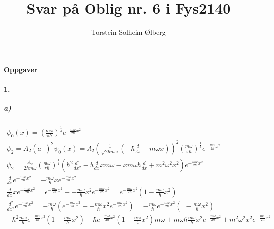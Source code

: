 \documentclass[11pt, A4paper,norsk]{article}
\author{Torstein Solheim Ølberg}
\title{Svar på Oblig nr. 6 i Fys2140}
\begin{document}
\maketitle
	\begin{center}
\Large \textbf{Oppgaver}
	\end{center}








\clearpage
		\paragraph{1.}
			\subparagraph{a)}
				\begin{gather*}
\psi_0(x) = \left( \frac{m \omega}{\pi \hbar} \right)^{\frac{1}{4}} e^{- \frac{m \omega}{2 \hbar} x^2} \\
\psi_2 = A_2 (a_+)^2 \psi_0(x) = A_2 \left( \frac{1}{\sqrt{2 \hbar m \omega}} \left( - \hbar \frac{d}{dx} + m \omega x \right) \right)^2 \left( \frac{m \omega}{\pi \hbar} \right)^{\frac{1}{4}} e^{- \frac{m \omega}{2 \hbar} x^2} \\
\psi_2 = \frac{A_2}{2 \hbar m \omega} \left( \frac{m \omega}{\pi \hbar} \right)^{\frac{1}{4}} \left( \hbar^2 \frac{d^2}{dx^2} - \hbar \frac{d}{dx} x m \omega - x m \omega \hbar \frac{d}{dx} + m^2 \omega^2 x^2 \right) e^{-\frac{m \omega}{2 \hbar} x^2} \\
\frac{d}{dx} e^{- \frac{m \omega}{2 \hbar} x^2} = - \frac{m \omega}{\hbar} x e^{- \frac{m \omega}{2 \hbar} x^2} \\
\frac{d}{dx} x e^{- \frac{m \omega}{2 \hbar} x^2} = e^{- \frac{m \omega}{2 \hbar} x^2} + - \frac{m \omega}{\hbar} x^2 e^{- \frac{m \omega}{2 \hbar} x^2} = e^{- \frac{m \omega}{2 \hbar} x^2} \left( 1 - \frac{m \omega}{\hbar} x^2 \right) \\
\frac{d^2}{dx^2} e^{- \frac{m \omega}{2 \hbar} x^2} = - \frac{m \omega}{\hbar} \left( e^{- \frac{m \omega}{2 \hbar} x^2} + - \frac{m \omega}{\hbar} x^2 e^{- \frac{m \omega}{2 \hbar} x^2} \right) = - \frac{m \omega}{\hbar} e^{- \frac{m \omega}{2 \hbar} x^2} \left( 1 - \frac{m \omega}{\hbar} x^2 \right) \\
- \hbar^2 \frac{m \omega}{\hbar} e^{- \frac{m \omega}{2 \hbar} x^2} \left( 1 - \frac{m \omega}{\hbar} x^2 \right) - \hbar e^{- \frac{m \omega}{2 \hbar} x^2} \left( 1 - \frac{m \omega}{\hbar} x^2 \right) m \omega + m \omega \hbar \frac{m \omega}{\hbar} x^2 e^{- \frac{m \omega}{2 \hbar} x^2} + m^2 \omega^2 x^2 e^{-\frac{m \omega}{2 \hbar} x^2} \\

\end{gather*}
\end{document}

